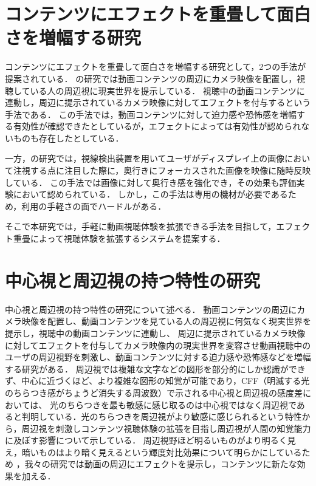 \section{コンテンツにエフェクトを重畳して面白さを増幅する研究}
コンテンツにエフェクトを重畳して面白さを増幅する研究として，2つの手法が提案されている\cite{shamo1, shamo2}．
\cite{shamo1}の研究では動画コンテンツの周辺にカメラ映像を配置し，視聴している人の周辺視に現実世界を提示している．
視聴中の動画コンテンツに連動し，周辺に提示されているカメラ映像に対してエフェクトを付与するという手法である．
この手法では，動画コンテンツに対して迫力感や恐怖感を増幅する有効性が確認できたとしているが，エフェクトによっては有効性が認められないものも存在したとしている．

一方，\cite{shamo2}の研究では，視線検出装置を用いてユーザがディスプレイ上の画像において注視する点に注目した際に，奥行きにフォーカスされた画像を映像に随時反映している．
この手法では画像に対して奥行き感を強化でき，その効果も評価実験において認められている．
しかし，この手法は専用の機材が必要であるため，利用の手軽さの面でハードルがある．

そこで本研究では，手軽に動画視聴体験を拡張できる手法を目指して，エフェクト重畳によって視聴体験を拡張するシステムを提案する．


\section{中心視と周辺視の持つ特性の研究}
中心視と周辺視の持つ特性の研究について述べる．
動画コンテンツの周辺にカメラ映像を配置し、動画コンテンツを見ている人の周辺視に何気なく現実世界を提示し，視聴中の動画コンテンツに連動し、
周辺に提示されているカメラ映像に対してエフェクトを付与してカメラ映像内の現実世界を変容させ動画視聴中のユーザの周辺視野を刺激し、動画コンテンツに対する迫力感や恐怖感などを増幅する研究がある\cite{shamo4}．
周辺視では複雑な文字などの図形を部分的にしか認識ができず、中心に近づくほど、より複雑な図形の知覚が可能であり\cite{shamo5}，CFF（明滅する光のちらつき感がちょうど消失する周波数）で示される中心視と周辺視の感度差においては、
光のちらつきを最も敏感に感じ取るのは中心視ではなく周辺視であると判明している\cite{shamo6}．光のちらつきを周辺視がより敏感に感じられるという特性から，周辺視を刺激しコンテンツ視聴体験の拡張を目指し周辺視が人間の知覚能力に及ぼす影響について示している\cite{shamo7}．
周辺視野ほど明るいものがより明るく見え，暗いものはより暗く見えるという輝度対比効果について明らかにしているため \cite{shamo8}，我々の研究では動画の周辺にエフェクトを提示し，コンテンツに新たな効果を加える．


